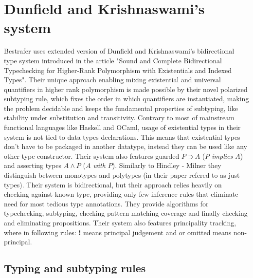 \documentclass[declaration,shortabstract,english]{iithesis}
\begin{document}
\section{Dunfield and Krishnaswami's system}
Bestrafer uses extended version of Dunfield and Krishnaswami's bidirectional type system introduced in the article
"Sound and Complete Bidirectional Typechecking for Higher-Rank Polymorphism with Existentials and Indexed Types"\cite{gadt-popl19}.
Their unique approach enabling mixing existential and universal quantifiers in higher rank polymorphism is made possible by
their novel polarized subtyping rule, which fixes the order in which quantifiers are instantiated, making the
problem decidable and keeps the fundamental properties of subtyping, like stability under substitution and transitivity.
Contrary to most of mainstream functional languages like Haskell and OCaml,
usage of existential types in their system is not tied to data types declarations. This means that existential types
don't have to be packaged in another datatype, instead they can be used like any other type constructor.
Their system also features guarded $P \supset A $ (\textit{$P$ implies $A$})
and asserting types $A \wedge  P$ (\textit{$A$ with $P$}).
Similarly to Hindley - Milner they distinguish between monotypes and polytypes (in their paper refered to as just types).
Their system is bidirectional, but their approach relies heavily on checking against known type, providing only few inference
rules that eliminate need for most tedious type annotations.
They provide algorithms for typechecking, subtyping, checking pattern matching coverage and finally checking and eliminating propositions.
Their system also features principality tracking, where in following
rules: \textbf{!} means principal judgement and \cancel{\textbf{!}} or omitted means non-principal.
\subsection*{Typing and subtyping rules}
\end{document}
